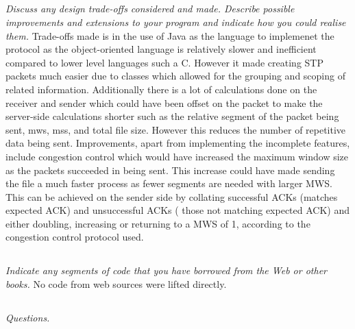 \documentclass[12pt]{article}
\begin{document}
\subsection{}
\textit{Discuss any design trade-offs considered and made. Describe possible improvements and extensions to your program and indicate how you could realise them.}
\newline
\newline Trade-offs made is in the use of Java as the language to implemenet the protocol as the object-oriented language is relatively slower and inefficient compared to lower level languages such a C. However it made creating STP packets much easier due to classes which allowed for the grouping and scoping of related information. Additionally there is a lot of calculations done on the receiver and sender which could have been offset on the packet to make the server-side calculations shorter such as the relative segment of the packet being sent, mws, mss, and total file size. However this reduces the number of repetitive data being sent. 
\newline Improvements, apart from implementing the incomplete features, include congestion control which would have increased the maximum window size as the packets succeeded in being sent. This increase could have made sending the file a much faster process as fewer segments are needed with larger MWS. This can be achieved on the sender side by collating successful ACKs (matches expected ACK) and unsuccessful ACKs ( those not matching expected ACK) and either doubling, increasing or returning to a MWS of 1, according to the congestion control protocol used. 
\subsection{}
\textit{Indicate any segments of code that you have borrowed from the Web or other books.}
\newline No code from web sources were lifted directly.
\subsection{}
\textit{Questions.}
\end{document}
